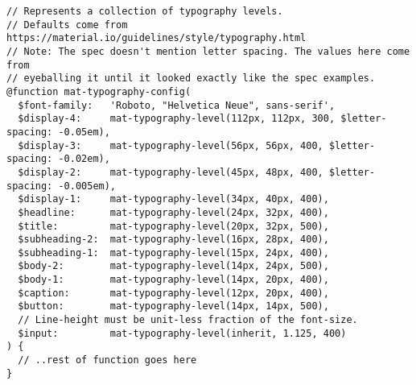 \begin{lstlisting}[caption=@angular/material/\_theming.scss]
// Represents a collection of typography levels.
// Defaults come from https://material.io/guidelines/style/typography.html
// Note: The spec doesn't mention letter spacing. The values here come from
// eyeballing it until it looked exactly like the spec examples.
@function mat-typography-config(
  $font-family:   'Roboto, "Helvetica Neue", sans-serif',
  $display-4:     mat-typography-level(112px, 112px, 300, $letter-spacing: -0.05em),
  $display-3:     mat-typography-level(56px, 56px, 400, $letter-spacing: -0.02em),
  $display-2:     mat-typography-level(45px, 48px, 400, $letter-spacing: -0.005em),
  $display-1:     mat-typography-level(34px, 40px, 400),
  $headline:      mat-typography-level(24px, 32px, 400),
  $title:         mat-typography-level(20px, 32px, 500),
  $subheading-2:  mat-typography-level(16px, 28px, 400),
  $subheading-1:  mat-typography-level(15px, 24px, 400),
  $body-2:        mat-typography-level(14px, 24px, 500),
  $body-1:        mat-typography-level(14px, 20px, 400),
  $caption:       mat-typography-level(12px, 20px, 400),
  $button:        mat-typography-level(14px, 14px, 500),
  // Line-height must be unit-less fraction of the font-size.
  $input:         mat-typography-level(inherit, 1.125, 400)
) {
  // ..rest of function goes here
}  
\end{lstlisting}



